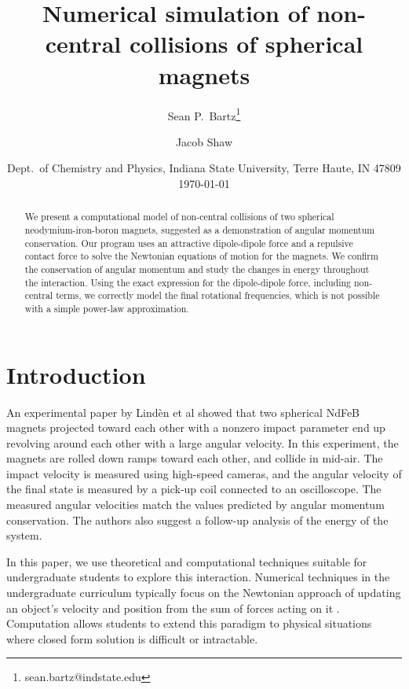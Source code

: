 \documentclass{article}
\begin{document}
\title{Numerical simulation of non-central collisions of spherical magnets}
\author{Sean P.~Bartz\footnote{sean.bartz@indstate.edu} \and Jacob Shaw}
\date{ 
Dept.~of Chemistry and Physics, Indiana State University, Terre Haute, IN 47809\\
\today}

\maketitle

\begin{abstract}
We present a computational model of non-central collisions  of two spherical neodymium-iron-boron magnets, suggested as a demonstration of angular momentum conservation.  Our program uses an attractive dipole-dipole force and a repulsive contact force to solve the Newtonian equations of motion for the magnets. We confirm the conservation of angular momentum and study the changes in energy throughout the interaction.  Using the exact expression for the dipole-dipole force, including non-central terms, we correctly model the final rotational frequencies, which is not possible with a simple power-law approximation.
\end{abstract}


\section{Introduction}
An experimental paper by Lind\`{e}n et al  \cite{Lindn2018} showed that two spherical NdFeB magnets projected toward each other with a nonzero impact parameter end up revolving around each other with a large angular velocity.  
In this experiment, the magnets are rolled down ramps toward each other, and collide in mid-air. The impact velocity is measured using high-speed cameras, and the angular velocity  of the final state is measured by a pick-up coil connected to an oscilloscope. The measured angular velocities match the values predicted by   angular momentum conservation. 
The authors also suggest a follow-up analysis of the energy of the system.

 In this paper, we use theoretical and computational techniques suitable for undergraduate students to explore this interaction.
Numerical techniques in the undergraduate curriculum typically focus on the Newtonian approach of updating an object's velocity and position from the sum of forces acting on it \cite{Weber2020}. Computation allows students to extend this paradigm to physical situations where closed form solution is  difficult or intractable. 
\end{document}
